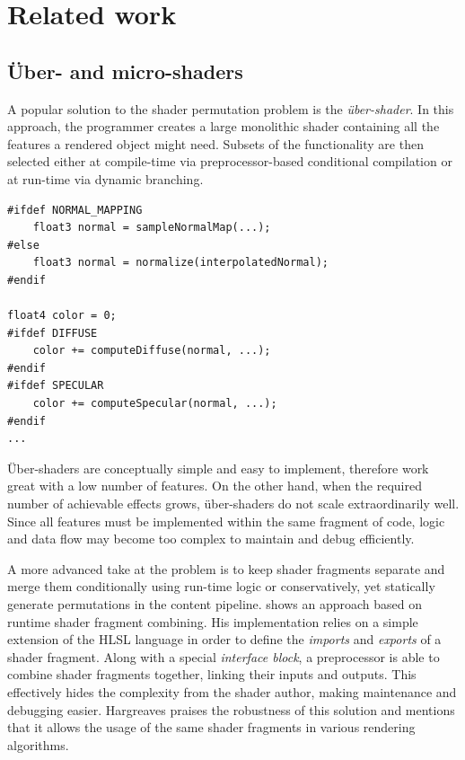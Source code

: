 
\chapter{ Related work }
\label{Chapter3}

\section{Über- and micro-shaders}

A popular solution to the shader permutation problem is the \emph{über-shader}. In this approach, the programmer creates a large monolithic shader containing all the features a rendered object might need. Subsets of the functionality are then selected either at compile-time via preprocessor-based conditional compilation or at run-time via dynamic branching.

\begin{lstlisting}[frame=single]
#ifdef NORMAL_MAPPING
    float3 normal = sampleNormalMap(...);
#else
    float3 normal = normalize(interpolatedNormal);
#endif

float4 color = 0;
#ifdef DIFFUSE
    color += computeDiffuse(normal, ...);
#endif
#ifdef SPECULAR
    color += computeSpecular(normal, ...);
#endif
...
\end{lstlisting}

Über-shaders are conceptually simple and easy to implement, therefore work great with a low number of features. On the other hand, when the required number of achievable effects grows, über-shaders do not scale extraordinarily well. Since all features must be implemented within the same fragment of code, logic and data flow may become too complex to maintain and debug efficiently.

A more advanced take at the problem is to keep shader fragments separate and merge them conditionally using run-time logic or conservatively, yet statically generate permutations in the content pipeline. \citet{Hargreaves04} shows an approach based on runtime shader fragment combining. His implementation relies on a simple extension of the HLSL language in order to define the \emph{imports} and \emph{exports} of a shader fragment. Along with a special \emph{interface block}, a preprocessor is able to combine shader fragments together, linking their inputs and outputs. This effectively hides the complexity from the shader author, making maintenance and debugging easier. Hargreaves praises the robustness of this solution and mentions that it allows the usage of the same shader fragments in various rendering algorithms.

